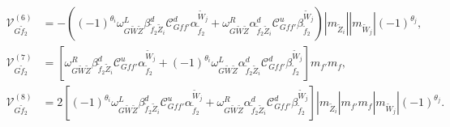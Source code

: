 \documentclass[final,3p,times,pdflatex]{elsarticle}
\begin{document}
\begin{align}
\mathcal{V}_{G \tilde{f}_2}^{(6)} &= -((-1)^{\theta_i}\omega_{G \tilde{W} \tilde{Z}}^L \beta_{\tilde{f}_2 \tilde{Z}_i}^{d} \mathcal{C}_{G f f'}^d \alpha_{\tilde{f}_2}^{\tilde{W}_j} + \omega_{G \tilde{W} \tilde{Z}}^R \alpha_{\tilde{f}_2 \tilde{Z}_i}^{d} \mathcal{C}_{G f f'}^u \beta_{\tilde{f}_2}^{\tilde{W}_j})|m_{\tilde{Z}_i}||m_{\tilde{W}_j}|(-1)^{\theta_j}, \\
\mathcal{V}_{G \tilde{f}_2}^{(7)} &= [\omega_{G \tilde{W} \tilde{Z}}^R \beta_{\tilde{f}_2 \tilde{Z}_i}^{d} \mathcal{C}_{G f f'}^u \alpha_{\tilde{f}_2}^{\tilde{W}_j} + (-1)^{\theta_i}\omega_{G \tilde{W} \tilde{Z}}^L \alpha_{\tilde{f}_2 \tilde{Z}_i}^{d} \mathcal{C}_{G f f'}^d \beta_{\tilde{f}_2}^{\tilde{W}_j}]m_{f'}m_{f} ,\\
\mathcal{V}_{G \tilde{f}_2}^{(8)} &= 2[(-1)^{\theta_i}\omega_{G \tilde{W} \tilde{Z}}^L \beta_{\tilde{f}_2 \tilde{Z}_i}^{d} \mathcal{C}_{G f f'}^u \alpha_{\tilde{f}_2}^{\tilde{W}_j} + \omega_{G \tilde{W} \tilde{Z}}^R \alpha_{\tilde{f}_2 \tilde{Z}_i}^{d} \mathcal{C}_{G f f'}^d \beta_{\tilde{f}_2}^{\tilde{W}_j}]|m_{\tilde{Z}_i}|m_{f'}m_{f}|m_{\tilde{W}_j}|(-1)^{\theta_j}.
\end{align}
\end{document}
